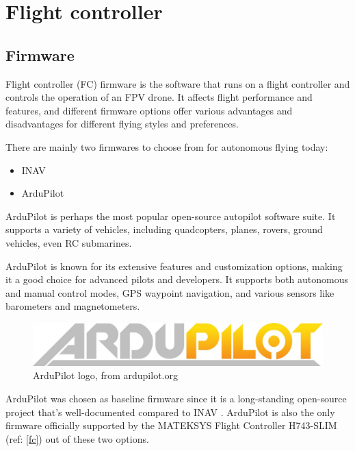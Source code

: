 \section{Flight controller}\label{firmware}
\subsection{Firmware}
\label{fc-firmware}
Flight controller (FC) firmware is the software that runs on a flight controller and controls the operation of an FPV drone. It affects flight performance and features, and different firmware options offer various advantages and disadvantages for different flying styles and preferences. \cite{firmware-FC}

There are mainly two firmwares \cite{firmware-FC} to choose from for autonomous flying today:
\begin{itemize}
  \item INAV
  \item ArduPilot
\end{itemize}

ArduPilot is perhaps the most popular open-source autopilot software suite. It supports a variety of vehicles, including quadcopters, planes, rovers, ground vehicles, even RC submarines.

ArduPilot is known for its extensive features and customization options, making it a good choice for advanced pilots and developers. It supports both autonomous and manual control modes, GPS waypoint navigation, and various sensors like barometers and magnetometers. \cite{firmware-FC}

\begin{figure}[!htb]
    \centering
    \includegraphics[width=\textwidth]{fig/ardupilot_logo.jpg}
    \caption{ArduPilot logo, from ardupilot.org \protect\cite{documentation-ArduPilot}}
\end{figure}

ArduPilot was chosen as baseline firmware since it is a long-standing open-source project that's well-documented \cite{documentation-ArduPilot} compared to INAV \cite{github-wiki-INAV}. ArduPilot is also the only firmware officially supported by the MATEKSYS Flight Controller H743-SLIM (ref: \ref{fc}) out of these two options.


